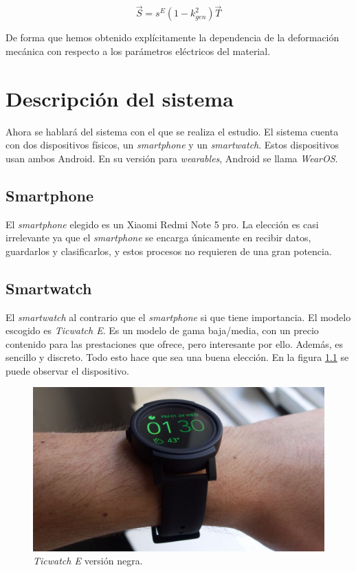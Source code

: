 \documentclass[12pt]{book}
\numberwithin{equation}{section}
\begin{document}
\begin{equation}
\vec{S} = s^E (1-k^2_{gen})\vec{T}
\end{equation}

De forma que hemos obtenido explícitamente la dependencia de la deformación mecánica con respecto a los parámetros eléctricos del material.


\chapter{Descripción del sistema}
Ahora se hablará del sistema con el que se realiza el estudio. El sistema cuenta con dos dispositivos físicos, un \textit{smartphone} y un \textit{smartwatch}. Estos dispositivos usan ambos Android. En su versión para \textit{wearables}, Android se llama \textit{WearOS}.
\section{Smartphone}
El \textit{smartphone} elegido es un Xiaomi Redmi Note 5 pro. La elección es casi irrelevante ya que el \textit{smartphone} se encarga únicamente en recibir datos, guardarlos y clasificarlos, y estos procesos no requieren de una gran potencia.
\section{Smartwatch}
El \textit{smartwatch} al contrario que el \textit{smartphone} si que tiene importancia. El modelo escogido es \textit{Ticwatch E}. Es un modelo de gama baja/media, con un precio contenido para las prestaciones que ofrece, pero interesante por ello. Además, es sencillo y discreto. Todo esto hace que sea una buena elección. En la figura \ref{fig:ticwatch} se puede observar el dispositivo.

\begin{figure}[h]
    \centering
    \includegraphics[width=1\textwidth]{ticwatche.jpg}
    \caption{\textit{Ticwatch E} versión negra.}
    \label{fig:ticwatch}
\end{figure}
\end{document}
